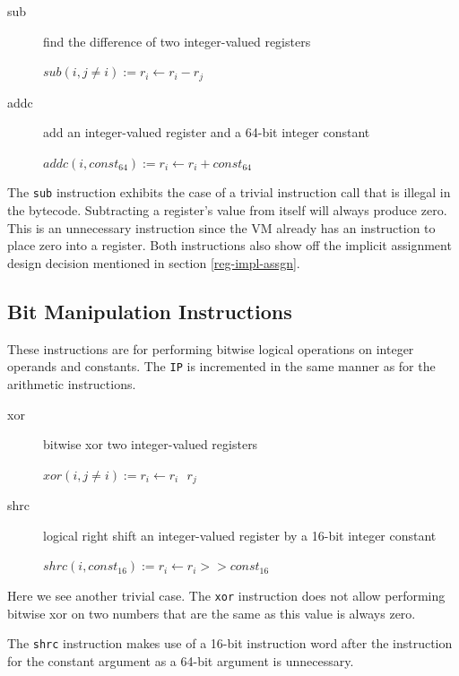 \documentclass[english,a4paper,12pt]{report}
\begin{document}
\begin{description}
	\item[sub] find the difference of two integer-valued registers
	
	$sub(i, j\neq i) := r _{i} \longleftarrow  r _{i} - r _{j} $ \\	
	
	\item[addc] add an integer-valued register and a 64-bit integer
	constant
	
	$addc(i, const _{64}) := r _{i} \longleftarrow  r _{i} + const 
	_{64} $ \\
\end{description}

The \verb|sub| instruction exhibits the case of a trivial instruction
call that is illegal in the bytecode. Subtracting a register's value
from itself will always produce zero. This is an unnecessary
instruction since the VM already has an instruction to place zero into
a register. Both instructions also show off the implicit assignment design
decision mentioned in section \ref{reg-impl-assgn}.

\subsection{Bit Manipulation Instructions}

These instructions are for performing bitwise logical operations on
integer operands and constants. The \verb|IP| is incremented in the
same manner as for the arithmetic instructions.

\begin{description}
	\item[xor] bitwise xor two integer-valued registers
	
	$xor(i, j \neq i) := r _{i} \longleftarrow  r _{i} \textbf{ \^{} 
	} r _{j} $ \\
	
	\item[shrc] logical right shift an integer-valued register by a 
	16-bit
	integer constant
	
	$shrc(i, const _{16}) :=  r _{i} \longleftarrow  r _{i} >> const 
	_{16} $ \\	
\end{description}

Here we see another trivial case. The \verb|xor| instruction does not
allow performing bitwise xor on two numbers that are the same as this
value is always zero.

The \verb|shrc| instruction makes use of a 16-bit instruction word
after the instruction for the constant argument as a 64-bit argument
is unnecessary.
\end{document}
